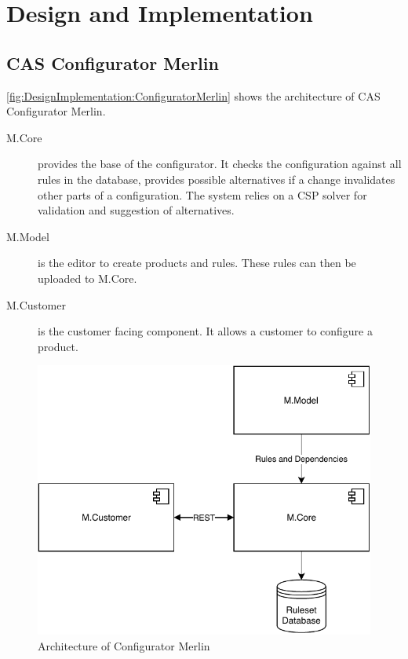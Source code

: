 \chapter{Design and Implementation}
\label{ch:DesignImplementation}


\section{CAS Configurator Merlin}
\label{sec:DesignImplementation:ConfiguratorMerlin}

\autoref{fig:DesignImplementation:ConfiguratorMerlin} shows the architecture of CAS Configurator Merlin.
\begin{description}
    \item[M.Core] provides the base of the configurator. It checks the configuration against all rules in the database, provides possible alternatives if a change invalidates other parts of a configuration. The system relies on a CSP solver for validation and suggestion of alternatives.
    \item[M.Model] is the editor to create products and rules. These rules can then be uploaded to M.Core.
    \item[M.Customer] is the customer facing component. It allows a customer to configure a product.
\end{description}

\begin{figure}
    \centering
    \includegraphics{./figures/50_design_and_implementation/MerlinConfigurator.pdf}
    \caption{Architecture of Configurator Merlin \cite[Fig. 4.1]{raabKollaborativeProduktkonfigurationEchtzeit2019}}
    \label{fig:DesignImplementation:ConfiguratorMerlin}
\end{figure}

